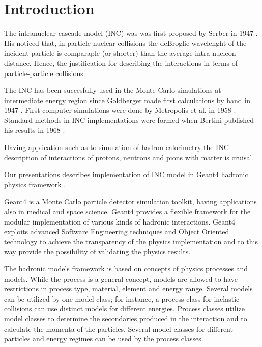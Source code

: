 \section{Introduction}

The intranuclear cascade model (INC) was was first proposed by Serber in 1947 \cite{serber47}.  
His noticed that, in particle nuclear collisions the deBroglie wavelenght of the incident particle is 
comparaple (or shorter) than the average intra-nucleon distance.
Hence, the justification for describing the interactions in terms of particle-particle  collisions.


The INC has been succesfully used in the Monte Carlo simulations at intermediate energy region 
since Goldberger made first calculations by hand in 1947 \cite{goldberger48}. 
First computer simulations were done by Metropolis et al. in 1958 \cite{metropolis58}. 
Standard methods in INC implementations were formed when Bertini published his results in 1968 \cite{bertini68}.

Having application such as to simulation of hadron calorimetry the INC description of interactions of protons, neutrons and pions with matter is cruisal.

Our presentations describes implementation of INC model in {\sc Geant4} hadronic physics framework \cite{}.


Geant4 is a Monte Carlo particle detector simulation toolkit, having applications also in  medical and space
science. 
Geant4 provides a flexible framework for the modular implementation of
various kinds of hadronic interactions. 
Geant4 exploits advanced Software Engineering techniques and Object
Oriented technology to achieve the transparency of the physics
implementation and to this way provide the possibility of validating the
physics results. 

The hadronic models framework is based on concepts of physics
processes and models. While the process is a general concept, models
are allowed to have restrictions in process type, material, element
and energy range.  Several models can be utilized by one model class; for instance, a
process class for inelastic collisions can use distinct models for different energies.
Process classes utilize model classes to determine the
secondaries produced in the interaction and to calculate the momenta
of the particles.  Several model classes for different particles and
energy regimes can be used by the process classes.





